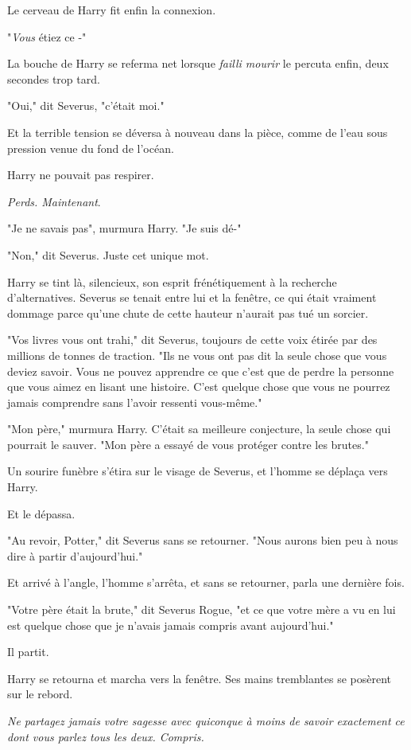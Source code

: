 Le cerveau de Harry fit enfin la connexion.

"\emph{Vous} étiez ce -"

La bouche de Harry se referma net lorsque \emph{failli mourir} le percuta enfin, deux secondes trop tard.

"Oui," dit Severus, "c'était moi."

Et la terrible tension se déversa à nouveau dans la pièce, comme de l'eau sous pression venue du fond de l'océan.

Harry ne pouvait pas respirer.

\emph{Perds. Maintenant}.

"Je ne savais pas", murmura Harry. "Je suis dé-"

"Non," dit Severus. Juste cet unique mot.

Harry se tint là, silencieux, son esprit frénétiquement à la recherche d'alternatives. Severus se tenait entre lui et la fenêtre, ce qui était vraiment dommage parce qu'une chute de cette hauteur n'aurait pas tué un sorcier.

"Vos livres vous ont trahi," dit Severus, toujours de cette voix étirée par des millions de tonnes de traction. "Ils ne vous ont pas dit la seule chose que vous deviez savoir. Vous ne pouvez apprendre ce que c'est que de perdre la personne que vous aimez en lisant une histoire. C'est quelque chose que vous ne pourrez jamais comprendre sans l'avoir ressenti vous-même."

"Mon père," murmura Harry. C'était sa meilleure conjecture, la seule chose qui pourrait le sauver. "Mon père a essayé de vous protéger contre les brutes."

Un sourire funèbre s'étira sur le visage de Severus, et l'homme se déplaça vers Harry.

Et le dépassa.

"Au revoir, Potter," dit Severus sans se retourner. "Nous aurons bien peu à nous dire à partir d'aujourd'hui."

Et arrivé à l'angle, l'homme s'arrêta, et sans se retourner, parla une dernière fois.

"Votre père était la brute," dit Severus Rogue, "et ce que votre mère a vu en lui est quelque chose que je n'avais jamais compris avant aujourd'hui."

Il partit.

Harry se retourna et marcha vers la fenêtre. Ses mains tremblantes se posèrent sur le rebord.

\emph{Ne partagez jamais votre sagesse avec quiconque à moins de savoir exactement ce dont vous parlez tous les deux. Compris.}


